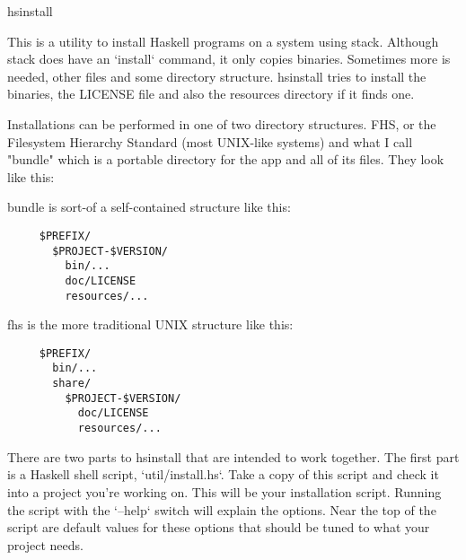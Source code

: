 \begin{hcarentry}[new]{hsinstall}
\makeheader

\vspace{5mm}

This is a utility to install Haskell programs on a system using
stack. Although stack does have an `install` command, it only copies
binaries. Sometimes more is needed, other files and some directory
structure. hsinstall tries to install the binaries, the LICENSE
file and also the resources directory if it finds one.

\vspace{5mm}

Installations can be performed in one of two directory
structures. FHS, or the Filesystem Hierarchy Standard (most UNIX-like
systems) and what I call "bundle" which is a portable directory
for the app and all of its files. They look like this:

\vspace{5mm}

bundle is sort-of a self-contained structure like this:

\vspace{5mm}

\begin{verbatim}
     $PREFIX/
       $PROJECT-$VERSION/
         bin/...
         doc/LICENSE
         resources/...
\end{verbatim}

\vspace{5mm}

fhs is the more traditional UNIX structure like this:

\vspace{5mm}

\begin{verbatim}
     $PREFIX/
       bin/...
       share/
         $PROJECT-$VERSION/
           doc/LICENSE
           resources/...
\end{verbatim}

\vspace{5mm}

There are two parts to hsinstall that are intended to work 
together. The first part is a Haskell shell script,
`util/install.hs`. Take a copy of this script and check it into
a project you're working on. This will be your installation
script. Running the script with the `--help` switch will explain
the options. Near the top of the script are default values for
these options that should be tuned to what your project needs.


\end{hcarentry}
